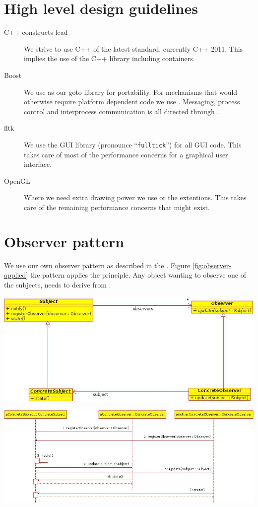 \section{High level design guidelines}

\begin{description}

	\item[C++ constructs lead] We strive to use C++ of the latest standard, currently C++ 2011.
	This implies the use of the C++ library including containers.
	
	\item[Boost] We use \boost as our goto library for portability. For mechanisms that would
	otherwise require platform dependent code we use \boost. Messaging, process control and
	interprocess communication is all directed through \boost.
	
	\item[fltk] We use the GUI library \fltk (pronounce ``\texttt{fulltick}'') for all GUI code.
	This takes care of most of the performance concerns for a graphical user interface.
	
	\item[OpenGL] Where we need extra drawing power we use \opengl or the \fltk {} extentions.
	This takes care of the remaining performance concerns that might exist.
	
\end{description}

\section{Observer pattern}

We use our own observer pattern as described in the . 
Figure \ref{fig:observer-applied} the pattern applies the principle. 
Any object wanting to observe one of the subjects, needs to 
derive from .

\begin{center}
	\includegraphics[width=.7\linewidth]{ObserverClassDiagram.jpeg}
	\label{fig:observer-pattern}
\end{center}

\begin{center}
	\includegraphics[width=.7\linewidth]{ObserverSequenceDiagram.jpeg}
	\label{fig:observer-applied}
\end{center}

